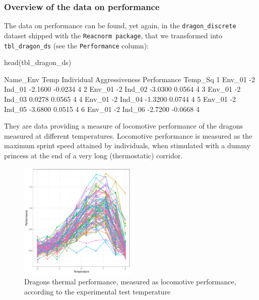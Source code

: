 \documentclass[a4paper,12pt,twoside]{article}
\begin{document}
\subsubsection{Overview of the data on performance}

The data on performance can be found, yet again, in the \texttt{dragon\_discrete} dataset shipped with the \texttt{Reacnorm package}, that we transformed into \texttt{tbl\_dragon\_ds} (see the \texttt{Performance} column):
\begin{Rinput}
  head(tbl_dragon_ds)
\end{Rinput}
\begin{Routput}
  Name_Env Temp Individual Aggressiveness Performance Temp_Sq
1   Env_01   -2     Ind_01        -2.1600     -0.0234       4
2   Env_01   -2     Ind_02        -3.0300      0.0564       4
3   Env_01   -2     Ind_03         0.0278      0.0565       4
4   Env_01   -2     Ind_04        -1.3200      0.0744       4
5   Env_01   -2     Ind_05        -3.6800      0.0515       4
6   Env_01   -2     Ind_06        -2.7200     -0.0668       4
\end{Routput}
They are data providing a measure of locomotive performance of the dragons measured at different temperatures. Locomotive performance is measured as the maximum sprint speed attained by individuals, when stimulated with a dummy princess at the end of a very long (thermostatic) corridor.

\begin{figure}[b!h!t!]
  \includegraphics[width = 0.5\textwidth]{TPC_discrete.pdf}
  \caption{Dragons thermal performance, measured as locomotive performance,  according to the experimental test temperature}
  \label{fig_tpc_rn_plain}
\end{figure}
\end{document}
